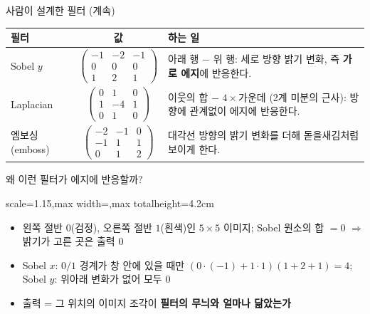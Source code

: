 \documentclass[aspectratio=169,11pt]{beamer}
\def\cellsz{0.5}%
\newcommand{\numgrid}[4]{%
  \foreach \v [count=\k from 0] in {#4} {%
    \pgfmathtruncatemacro{\rr}{int(\k/#3)}%
    \pgfmathtruncatemacro{\cc}{mod(\k,#3)}%
    \draw[black!55] ({#1+\cc*\cellsz},{#2-\rr*\cellsz}) rectangle ++(\cellsz,-\cellsz);%
    \node[font=\small] at ({#1+\cc*\cellsz+0.5*\cellsz},{#2-\rr*\cellsz-0.5*\cellsz}) {\v};%
  }}
\begin{document}
\begin{frame}{사람이 설계한 필터 (계속)}
\small
\centering
\footnotesize\renewcommand{\arraystretch}{1.1}
\begin{tabular}{@{}l c p{}@{}}
\toprule
필터 & 값 & 하는 일 \\
\midrule
Sobel $y$ & $\begin{pmatrix}-1&-2&-1\\0&0&0\\1&2&1\end{pmatrix}$
& 아래 행 $-$ 위 행: 세로 방향 밝기 변화, 즉 \textbf{가로 에지}에 반응한다. \\[4pt]
Laplacian & $\begin{pmatrix}0&1&0\\1&-4&1\\0&1&0\end{pmatrix}$
& 이웃의 합 $-$ $4\times$가운데 (2계 미분의 근사): 방향에 관계없이 에지에 반응한다. \\[4pt]
엠보싱 (emboss) & $\begin{pmatrix}-2&-1&0\\-1&1&1\\0&1&2\end{pmatrix}$
& 대각선 방향의 밝기 변화를 더해 돋을새김처럼 보이게 한다. \\
\bottomrule
\end{tabular}
\end{frame}

\begin{frame}{왜 이런 필터가 에지에 반응할까?}
\centering
\begin{adjustbox}{scale=1.15,max width=\linewidth,max totalheight=4.2cm}
\end{adjustbox}
\raggedright
\small
\begin{itemize}
\item 왼쪽 절반 $0$(검정), 오른쪽 절반 $1$(흰색)인 $5\times5$ 이미지; Sobel 원소의 합 $=0$ $\Rightarrow$ 밝기가 고른 곳은 출력 $0$
\item Sobel $x$: $0/1$ 경계가 창 안에 있을 때만 $(0\cdot(-1)+1\cdot1)(1+2+1)=4$; Sobel $y$: 위아래 변화가 없어 모두 $0$
\item 출력 = 그 위치의 이미지 조각이 \textbf{필터의 무늬와 얼마나 닮았는가}
\end{itemize}
\end{frame}
\end{document}
